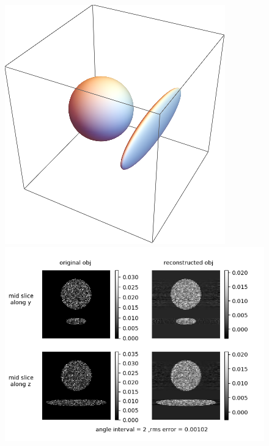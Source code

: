 \documentclass[slidestop,compress,12pt]{beamer}
\begin{document}
\section[3D reconstruction]{}
\begin{frame}
    \begin{figure}
    \centering
        \begin{minipage}{0.2\textwidth}
            \includegraphics[width=1\linewidth]{imgs/obj.png}
        \end{minipage}%
        \begin{minipage}{0.8\textwidth}
            \includegraphics[width=1\linewidth]{imgs/mid_slices.png}
        \end{minipage}
    \end{figure}
\end{frame}
\end{document}
